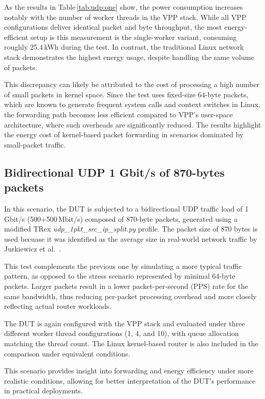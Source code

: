 As the results in Table \ref{tab:udp:one} show, the power consumption increases notably with the number of worker threads in the VPP stack. 
While all VPP configurations deliver identical packet and byte throughput, the most energy-efficient setup is this measurement is the single-worker variant, consuming roughly 25.4 kWh during the test. 
In contrast, the traditional Linux network stack demonstrates the highest energy usage, despite handling the same volume of packets.

This discrepancy can likely be attributed to the cost of processing a high number of small packets in kernel space. 
Since the test uses fixed-size 64-byte packets, which are known to generate frequent system calls and context switches in Linux, 
the forwarding path becomes less efficient compared to VPP’s user-space architecture, where such overheads are significantly reduced. 
The results highlight the energy cost of kernel-based packet forwarding in scenarios dominated by small-packet traffic.

\subsection{Bidirectional UDP 1 Gbit/s of 870-bytes packets}

In this scenario, the DUT is subjected to a bidirectional UDP traffic load of 1\,Gbit/s (500+500\,Mbit/s) composed of 870-byte packets, 
generated using a modified TRex \textit{udp\_1pkt\_src\_ip\_split.py} profile. 
The packet size of 870 bytes is used becuase it was identified as the average size in real-world network traffic by Jurkiewicz et al.~\cite{JURKIEWICZ202115}.

This test complements the previous one by simulating a more typical traffic pattern, as opposed to the stress scenario represented by minimal 64-byte packets. 
Larger packets result in a lower packet-per-second (PPS) rate for the same bandwidth, thus reducing per-packet processing overhead and more closely reflecting actual router workloads.

The DUT is again configured with the VPP stack and evaluated under three different worker thread configurations (1, 4, and 10), with queue allocation matching the thread count. 
The Linux kernel-based router is also included in the comparison under equivalent conditions.

This scenario provides insight into forwarding and energy efficiency under more realistic conditions, allowing for better interpretation of the DUT’s performance in practical deployments.


